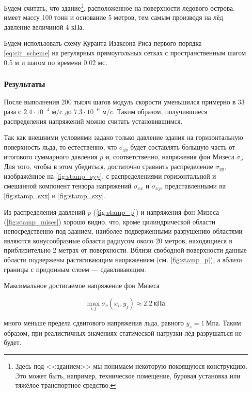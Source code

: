 Будем считать, что здание\footnote{Здесь под <<зданием>> мы понимаем некоторую покоящуюся конструкцию. Это может быть, например, техническое помещение, буровая установка или тяжёлое транспортное средство.}, расположенное на поверхности ледового острова, имеет массу 100 тонн и основание 5 метров, тем самым производя на лёд давление величиной 4 кПа.

Будем использовать схему Куранта-Изак\-сона-Риса первого порядка \eqref{eq:cir_scheme} на регулярных прямоугольных сетках с пространственным шагом 0.5 м и шагом по времени 0.02 мс.

\subsubsection{Результаты}

После выполнения 200 тысяч шагов модуль скорости уменьшился примерно в 33 раза с $2.4\cdot10^{-4}$ м/c до $7.3\cdot10^{-6}$ м/c. Таким образом, получившиеся распределения напряжений можно считать установившимся.

Так как внешними условиями задано только давление здания на горизонтальную поверхность льда, то естественно, что $\sigma_{yy}$ будет составлять большую часть от итогового суммарного давления $p$ и, соответственно, напряжения фон Мизеса $\sigma_\nu$. Для того, чтобы в этом убедиться, достаточно сравнить распределение $\sigma_{yy}$, изображённое на \autoref{fig:stamp_syy}, с распределениями горизонтальной и смешанной компонент тензора напряжений $\sigma_{xx}$ и $\sigma_{xy}$, представленными на \autoref{fig:stamp_sxx} и \autoref{fig:stamp_sxy}.

Из распределения давлений $p$ (\autoref{fig:stamp_p}) и напряжения фон Мизеса (\autoref{fig:stamp_mises}) хорошо видно, что, кроме цилиндрической области непосредственно под зданием, наиболее подверженными разрушению областями являются конусообразные области радиусом около 20 метров, находящиеся в приблизительно 2 метрах от поверхности. Вблизи свободной поверхности данные области подвержены растягивающим напряжениям (см. \autoref{fig:stamp_p}), а вблизи границы с придонным слоем --- сдавливающим.

Максимальное достигаемое напряжение фон Мизеса 

\begin{equation*}
    \max_{i,j} \sigma_\nu\left(x_i, y_j\right) \approx 2.2~ \text{кПа} .
\end{equation*}

\noindent много меньше предела сдвигового напряжения льда, равного $y_s = 1~\text{Мпа}$. Таким образом, при реалистичных значениях статической нагрузки лёд разрушаться не будет.

